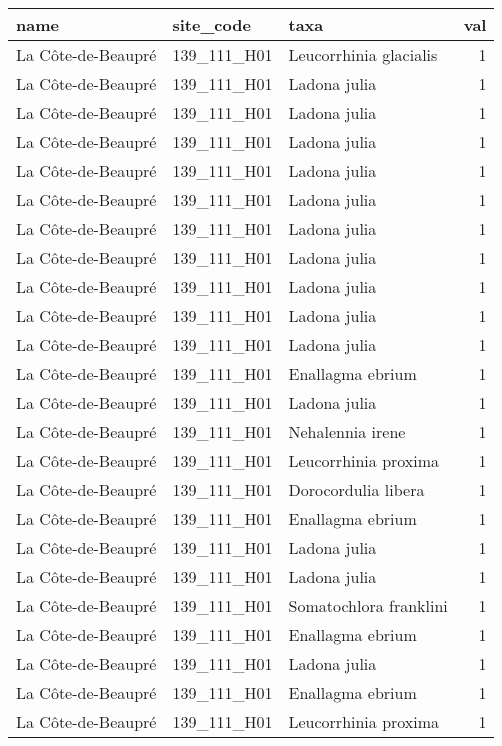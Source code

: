 \documentclass[
]{book}
\begin{document}
\begin{tabular}{l|l|l|r}
\hline
name & site\_code & taxa & val\\
\hline
La Côte-de-Beaupré & 139\_111\_H01 & Leucorrhinia glacialis & 1\\
\hline
La Côte-de-Beaupré & 139\_111\_H01 & Ladona julia & 1\\
\hline
La Côte-de-Beaupré & 139\_111\_H01 & Ladona julia & 1\\
\hline
La Côte-de-Beaupré & 139\_111\_H01 & Ladona julia & 1\\
\hline
La Côte-de-Beaupré & 139\_111\_H01 & Ladona julia & 1\\
\hline
La Côte-de-Beaupré & 139\_111\_H01 & Ladona julia & 1\\
\hline
La Côte-de-Beaupré & 139\_111\_H01 & Ladona julia & 1\\
\hline
La Côte-de-Beaupré & 139\_111\_H01 & Ladona julia & 1\\
\hline
La Côte-de-Beaupré & 139\_111\_H01 & Ladona julia & 1\\
\hline
La Côte-de-Beaupré & 139\_111\_H01 & Ladona julia & 1\\
\hline
La Côte-de-Beaupré & 139\_111\_H01 & Ladona julia & 1\\
\hline
La Côte-de-Beaupré & 139\_111\_H01 & Enallagma ebrium & 1\\
\hline
La Côte-de-Beaupré & 139\_111\_H01 & Ladona julia & 1\\
\hline
La Côte-de-Beaupré & 139\_111\_H01 & Nehalennia irene & 1\\
\hline
La Côte-de-Beaupré & 139\_111\_H01 & Leucorrhinia proxima & 1\\
\hline
La Côte-de-Beaupré & 139\_111\_H01 & Dorocordulia libera & 1\\
\hline
La Côte-de-Beaupré & 139\_111\_H01 & Enallagma ebrium & 1\\
\hline
La Côte-de-Beaupré & 139\_111\_H01 & Ladona julia & 1\\
\hline
La Côte-de-Beaupré & 139\_111\_H01 & Ladona julia & 1\\
\hline
La Côte-de-Beaupré & 139\_111\_H01 & Somatochlora franklini & 1\\
\hline
La Côte-de-Beaupré & 139\_111\_H01 & Enallagma ebrium & 1\\
\hline
La Côte-de-Beaupré & 139\_111\_H01 & Ladona julia & 1\\
\hline
La Côte-de-Beaupré & 139\_111\_H01 & Enallagma ebrium & 1\\
\hline
La Côte-de-Beaupré & 139\_111\_H01 & Leucorrhinia proxima & 1\\

\end{tabular}
\end{document}

